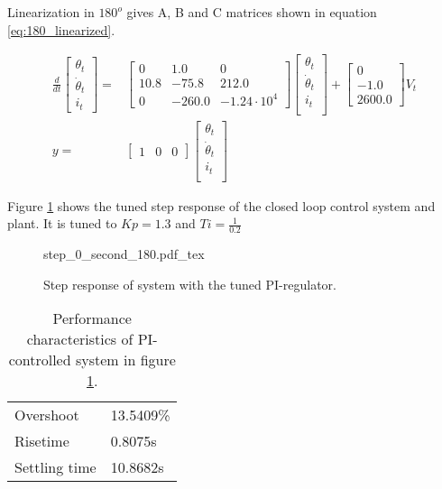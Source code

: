 \documentclass[../../../Main]{subfiles}
\begin{document}
Linearization in $180^o$ gives A, B and C matrices shown in equation \ref{eq:180_linearized}.

\begin{equation}
      \label{eq:180_linearized}
      \begin{split}
      \frac{d}{dt}
    \begin{bmatrix}
        \theta_t \\
        \dot \theta_t \\
        i_t
    \end{bmatrix}
    =&
    \begin{bmatrix}0 & 1.0 & 0\\ 10.8 & -75.8 & 212.0\\ 0 & -260.0 & -1.24\cdot10^4 \end{bmatrix}
    \begin{bmatrix}
        \theta_t \\
        \dot \theta_t \\
        i_t \\
    \end{bmatrix}
    +
    \begin{bmatrix}
    0\\ -1.0\\ 2600.0
    \end{bmatrix}
    V_t
\\
      y =&
    \begin{bmatrix}
        1 & 0 & 0
    \end{bmatrix}
    \begin{bmatrix}
        \theta_t \\
        \dot \theta_t\\
        i_t\\
    \end{bmatrix}
    \end{split}
\end{equation}


Figure \ref{fig:step_0_second_180} shows the tuned step response of the closed loop control system and plant.
It is tuned to $Kp = 1.3$ and $Ti = \frac{1}{0.2}$
\begin{figure}[H]
\centering
\def\svgwidth{\textwidth}
{step_0_second_180.pdf_tex}
\caption{Step response of system with the tuned PI-regulator.}
\label{fig:step_0_second_180}
\end{figure}

\begin{table}[h]
	 \centering
	 \begin{tabular}{ll}
		 Overshoot & 13.5409\%\\
		 Risetime  & 0.8075s\\
		 Settling time & 10.8682s
	 \end{tabular}
	 \caption{Performance characteristics of PI-controlled system in figure \ref{fig:step_0_second_180}.}
	 \label{tab:performance_0_4}
\end{table}
\end{document}
